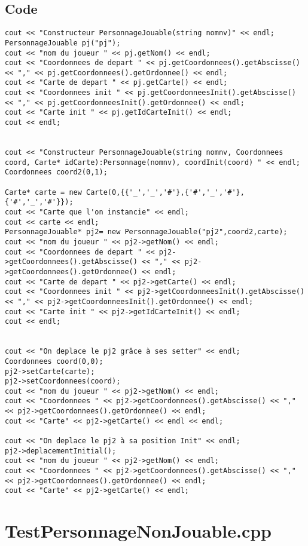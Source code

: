         \subsection{Code}
\begin{lstlisting}
cout << "Constructeur PersonnageJouable(string nomnv)" << endl;
PersonnageJouable pj("pj");
cout << "nom du joueur " << pj.getNom() << endl;
cout << "Coordonnees de depart " << pj.getCoordonnees().getAbscisse() << "," << pj.getCoordonnees().getOrdonnee() << endl;
cout << "Carte de depart " << pj.getCarte() << endl;
cout << "Coordonnees init " << pj.getCoordonneesInit().getAbscisse() << "," << pj.getCoordonneesInit().getOrdonnee() << endl;
cout << "Carte init " << pj.getIdCarteInit() << endl;
cout << endl;


cout << "Constructeur PersonnageJouable(string nomnv, Coordonnees coord, Carte* idCarte):Personnage(nomnv), coordInit(coord) " << endl;
Coordonnees coord2(0,1);

Carte* carte = new Carte(0,{{'_','_','#'},{'#','_','#'},{'#','_','#'}});
cout << "Carte que l'on instancie" << endl;
cout << carte << endl;
PersonnageJouable* pj2= new PersonnageJouable("pj2",coord2,carte);
cout << "nom du joueur " << pj2->getNom() << endl;
cout << "Coordonnees de depart " << pj2->getCoordonnees().getAbscisse() << "," << pj2->getCoordonnees().getOrdonnee() << endl;
cout << "Carte de depart " << pj2->getCarte() << endl;
cout << "Coordonnees init " << pj2->getCoordonneesInit().getAbscisse() << "," << pj2->getCoordonneesInit().getOrdonnee() << endl;
cout << "Carte init " << pj2->getIdCarteInit() << endl;
cout << endl;


cout << "On deplace le pj2 grâce à ses setter" << endl;
Coordonnees coord(0,0);
pj2->setCarte(carte);
pj2->setCoordonnees(coord);
cout << "nom du joueur " << pj2->getNom() << endl;
cout << "Coordonnees " << pj2->getCoordonnees().getAbscisse() << "," << pj2->getCoordonnees().getOrdonnee() << endl;
cout << "Carte" << pj2->getCarte() << endl << endl;

cout << "On deplace le pj2 à sa position Init" << endl;
pj2->deplacementInitial();
cout << "nom du joueur " << pj2->getNom() << endl;
cout << "Coordonnees " << pj2->getCoordonnees().getAbscisse() << "," << pj2->getCoordonnees().getOrdonnee() << endl;
cout << "Carte" << pj2->getCarte() << endl;	
	\end{lstlisting}
    \section{TestPersonnageNonJouable.cpp}
